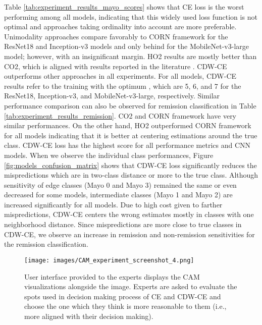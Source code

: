 \documentclass[runningheads]{llncs}
\begin{document}
Table \ref{tab:experiment_results_mayo_scores} shows that CE loss is the worst performing among all models, indicating that this widely used loss function is not optimal and approaches taking ordinality into account are more preferable. Unimodality approaches compare favorably to CORN framework for the ResNet18 and Inception-v3 models and only behind for the MobileNet-v3-large model; however, with an insignificant margin. HO2 results are mostly better than CO2, which is aligned with results reported in the literature \cite{albuquerque2021ordinal}. CDW-CE outperforms other approaches in all experiments. For all models, CDW-CE results refer to the training with the optimum , which are 5, 6, and 7 for the ResNet18, Inception-v3, and MobileNet-v3-large, respectively. Similar performance comparison can also be observed for remission classification in Table \ref{tab:experiment_results_remission}. CO2 and CORN framework have very similar performances. On the other hand, HO2 outperformed CORN framework for all models indicating that it is better at centering estimations around the true class. CDW-CE loss has the highest score for all performance metrics and CNN models. When we observe the individual class performances, Figure \ref{fig:models_confusion_matrix} shows that CDW-CE loss significantly reduces the mispredictions which are in two-class distance or more to the true class. Although sensitivity of edge classes (Mayo 0 and Mayo 3) remained the same or even decreased for some models, intermediate classes (Mayo 1 and Mayo 2) are increased significantly for all models. Due to high cost given to farther mispredictions, CDW-CE centers the wrong estimates mostly in classes with one neighborhood distance. Since mispredictions are more close to true classes in CDW-CE, we observe an increase in remission and non-remission sensitivities for the remission classification.

\begin{figure}[t!]
  \centering
  \texttt{[image: images/CAM\_experiment\_screenshot\_4.png]}
  \caption{User interface provided to the experts displays the CAM visualizations alongside the image. Experts are asked to evaluate the spots used in decision making process of CE and CDW-CE and choose the one which they think is more reasonable to them (i.e., more aligned with their decision making).} 
  \label{fig:cam_experiment_screenshot}
\end{figure}
\end{document}
